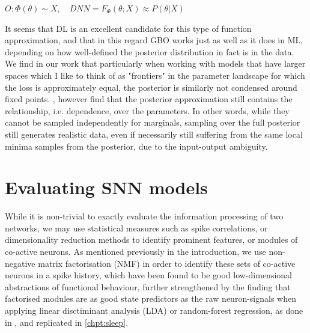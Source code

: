 \documentclass[mphil,deptreport,ianc]{infthesis} %
\begin{document}
\begin{math}
    O: \Phi(\theta) \sim X, \quad
    DNN = F_\Phi(\theta; X) \approx P(\theta|X)
\end{math}

It seems that DL is an excellent candidate for this type of function approximation, and that in this regard GBO works just as well as it does in ML, depending on how well-defined the posterior distribution in fact is in the data.
We find in our work that particularly when working with models that have larger spaces which I like to think of as "frontiers" in the parameter landscape for which the loss is approximately equal, the posterior is similarly not condensed around fixed points.
\cite{Lueckmann2021}, however find that the posterior approximation still contains the relationship, i.e. dependence, over the parameters. %
In other words, while they cannot be sampled independently for marginals, sampling over the full posterior still generates realistic data, even if necessarily still suffering from the same local minima samples from the posterior, due to the input-output ambiguity.


\section{Evaluating SNN models}


While it is non-trivial to exactly evaluate the information processing of two networks, we may use statistical measures such as spike correlations, or dimensionality reduction methods to identify prominent features, or modules of co-active neurons.
As mentioned previously in the introduction, we use non-negative matrix factorisation (NMF) \cite{Seung1999, Seung2001} in order to identify these sets of co-active neurons in a spike history, which have been found to be good low-dimensional abstractions of functional behaviour, further strengthened by the finding that factorised modules are as good state predictors as the raw neuron-signals when applying linear disctiminant analysis (LDA) or random-forest regression, as done in \cite{Onken2016a}, and replicated in \ref{chpt:sleep}.
\end{document}
